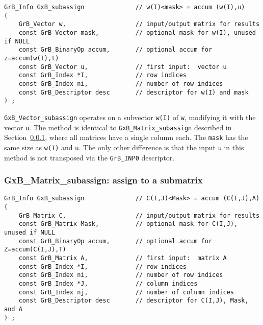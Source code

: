 \documentclass[12pt]{article}
\begin{document}
\begin{mdframed}[userdefinedwidth=6in]
{\footnotesize
\begin{verbatim}
GrB_Info GxB_subassign              // w(I)<mask> = accum (w(I),u)
(
    GrB_Vector w,                   // input/output matrix for results
    const GrB_Vector mask,          // optional mask for w(I), unused if NULL
    const GrB_BinaryOp accum,       // optional accum for z=accum(w(I),t)
    const GrB_Vector u,             // first input:  vector u
    const GrB_Index *I,             // row indices
    const GrB_Index ni,             // number of row indices
    const GrB_Descriptor desc       // descriptor for w(I) and mask
) ;
\end{verbatim} } \end{mdframed}

\verb'GxB_Vector_subassign' operates on a subvector \verb'w(I)' of \verb'w',
modifying it with the vector \verb'u'.  The method is identical to
\verb'GxB_Matrix_subassign' described in Section~\ref{subassign_matrix}, where
all matrices have a single column each.  The \verb'mask' has the same size as
\verb'w(I)' and \verb'u'.  The only other difference is that the input \verb'u'
in this method is not transposed via the \verb'GrB_INP0' descriptor.

\newpage
\subsubsection{{\sf GxB\_Matrix\_subassign:} assign to a submatrix }
\label{subassign_matrix}

\begin{mdframed}[userdefinedwidth=6in]
{\footnotesize
\begin{verbatim}
GrB_Info GxB_subassign              // C(I,J)<Mask> = accum (C(I,J),A)
(
    GrB_Matrix C,                   // input/output matrix for results
    const GrB_Matrix Mask,          // optional mask for C(I,J), unused if NULL
    const GrB_BinaryOp accum,       // optional accum for Z=accum(C(I,J),T)
    const GrB_Matrix A,             // first input:  matrix A
    const GrB_Index *I,             // row indices
    const GrB_Index ni,             // number of row indices
    const GrB_Index *J,             // column indices
    const GrB_Index nj,             // number of column indices
    const GrB_Descriptor desc       // descriptor for C(I,J), Mask, and A
) ;
\end{verbatim} } \end{mdframed}
\end{document}
